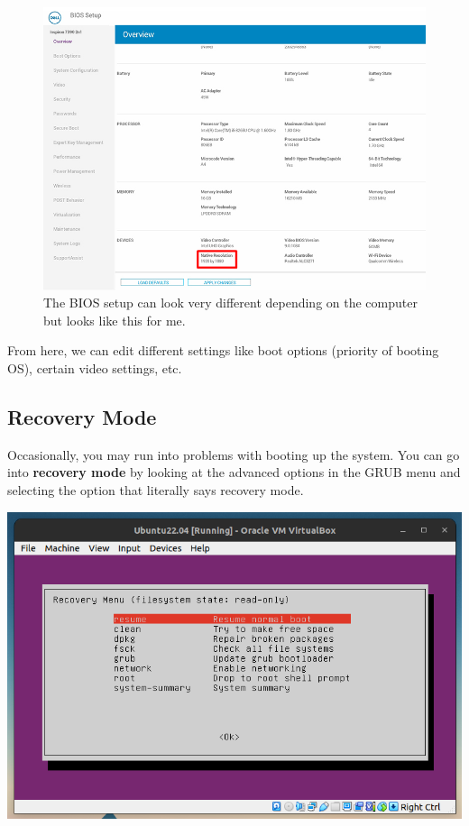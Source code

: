 \documentclass{article}
\begin{document}
    \begin{figure}[H]
      \centering 
      \includegraphics[scale=0.45]{img/firmware.jpeg}
      \caption{The BIOS setup can look very different depending on the computer but looks like this for me.} 
      \label{fig:bios_setup}
    \end{figure}

    From here, we can edit different settings like boot options (priority of booting OS), certain video settings, etc. 

  \subsection{Recovery Mode}

    Occasionally, you may run into problems with booting up the system. You can go into \textbf{recovery mode} by looking at the advanced options in the GRUB menu and selecting the option that literally says recovery mode. 

    \begin{center}
      \includegraphics[scale=0.3]{img/recovery1.png}
    \end{center}
\end{document}
